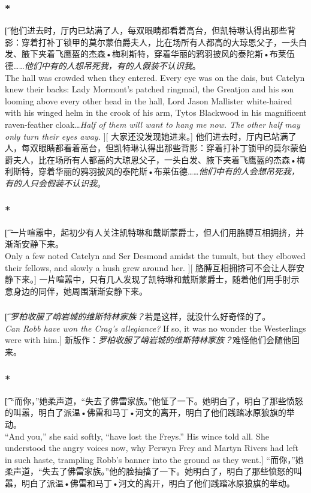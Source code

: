 \documentclass[12pt,a4paper]{article}
\begin{document}
\subsubsection{\color{red}*}\t[
	他们进去时，厅内已站满了人，每双眼睛都看着高台，但凯特琳认得出那些背影：穿着打补丁锁甲的莫尔蒙伯爵夫人，比在场所有人都高的大琼恩父子，一头白发、腋下夹着飞鹰盔的杰森•梅利斯特，穿着华丽的鸦羽披风的泰陀斯•布莱伍德……\emph{他们中有的人想吊死我，有的人假装不认识我}。\\
	The hall was crowded when they entered. Every eye was on the dais, but Catelyn knew their backs: Lady Mormont's patched ringmail, the Greatjon and his son looming above every other head in the hall, Lord Jason Mallister white-haired with his winged helm in the crook of his arm, Tytos Blackwood in his magnificent raven-feather cloak\ldots \emph{Half of them will want to hang me now. The other half may only turn their eyes away.} ][
	大家还没发现她进来。]
	他们进去时，厅内已站满了人，每双眼睛都看着高台，但凯特琳认得出那些背影：穿着打补丁锁甲的莫尔蒙伯爵夫人，比在场所有人都高的大琼恩父子，一头白发、腋下夹着飞鹰盔的杰森•梅利斯特，穿着华丽的鸦羽披风的泰陀斯•布莱伍德……\emph{他们中有的人会想吊死我，有的人只会假装不认识我}。

\subsubsection{\color{red}*}\t[
	一片喧嚣中，起初少有人关注凯特琳和戴斯蒙爵士，但人们用胳膊互相拥挤，并渐渐安静下来。\\
	Only a few noted Catelyn and Ser Desmond amidst the tumult, but they elbowed their fellows, and slowly a hush grew around her. ][
	胳膊互相拥挤可不会让人群安静下来。]
	一片喧嚣中，只有几人发现了凯特琳和戴斯蒙爵士，随着他们用手肘示意身边的同伴，她周围渐渐安静下来。
	
\subsubsection{}\t[	
	\emph{罗柏收服了峭岩城的维斯特林家族？}若是这样，就没什么好奇怪的了。\\
	\emph{Can Robb have won the Crag's allegiance?} If so, it was no wonder the Westerlings were with him.]
	新版作：\emph{罗柏收服了峭岩城的维斯特林家族？}难怪他们会随他回来。
	
	
\subsubsection{\color{red}*}\t[
	“而你，”她柔声道，“失去了佛雷家族。”他怔了一下。她明白了，明白了那些愤怒的叫嚣，明白了派温•佛雷和马丁•河文的离开，明白了他们践踏冰原狼旗的举动。\\
	“And you,” she said softly, “have lost the Freys.” His wince told all. She understood the angry voices now, why Perwyn Frey and Martyn Rivers had left in such haste, trampling Robb's banner into the ground as they went.]
	“而你，”她柔声道，“失去了佛雷家族。”他的脸抽搐了一下。她明白了，明白了那些愤怒的叫嚣，明白了派温•佛雷和马丁•河文的离开，明白了他们践踏冰原狼旗的举动。
	
\end{document}
